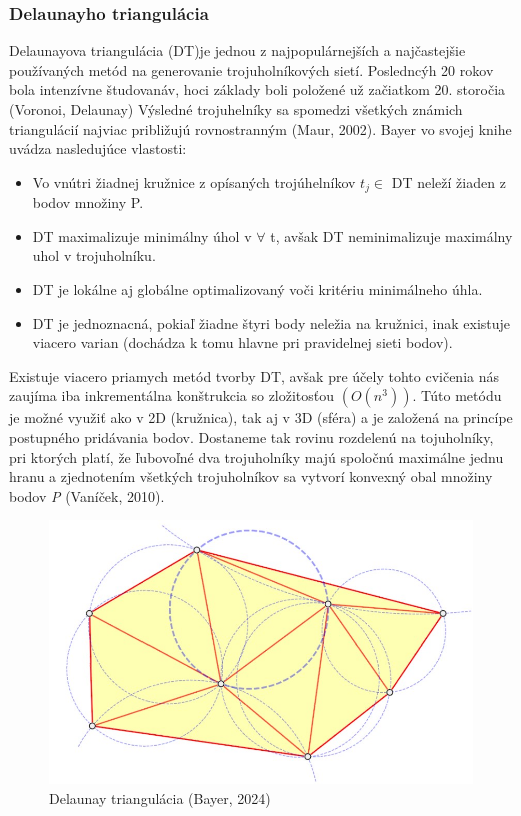 \documentclass[12pt]{article}
\begin{document}
\subsubsection*{Delaunayho triangulácia}
Delaunayova triangulácia (DT)je jednou z najpopulárnejších a najčastejšie používaných metód na generovanie trojuholníkových sietí. Posledncýh 20 rokov bola intenzívne študovanáv, hoci základy boli položené už začiatkom 20. storočia (Voronoi, Delaunay) Výsledné trojuhelníky sa spomedzi všetkých známich triangulácií najviac približujú rovnostranným (Maur, 2002). Bayer vo svojej knihe uvádza nasledujúce vlastosti: 
\begin{itemize}
    \item Vo vnútri žiadnej kružnice z opísaných trojúhelníkov  $t_j \in $  DT neleží žiaden z bodov množiny P.

    \item DT maximalizuje minimálny úhol v $\forall$ t, avšak DT neminimalizuje maximálny uhol v trojuholníku.
    \item DT je lokálne aj globálne optimalizovaný voči kritériu minimálneho úhla.
    \item DT je jednoznacná, pokiaľ žiadne štyri body neležia na kružnici, inak existuje viacero varian (dochádza k tomu hlavne pri pravidelnej sieti bodov).
\end{itemize}  \par
Existuje viacero priamych metód tvorby DT, avšak pre účely tohto cvičenia nás zaujíma iba inkrementálna konštrukcia so zložitosťou $(O(n^3))$. Túto metódu je možné využiť ako v 2D (kružnica), tak aj v 3D (sféra) a je založená na princípe postupného pridávania bodov. Dostaneme tak rovinu rozdelenú na tojuholníky, pri ktorých platí, že ľubovoľné dva trojuholníky majú spoločnú maximálne jednu hranu a zjednotením všetkých trojuholníkov sa vytvorí konvexný obal množiny bodov \textit{P} (Vaníček, 2010).\par
\begin{figure}[h]
    \centering
    \includegraphics[width=0.8\linewidth]{latex/images/dt.jpg}
    \caption{Delaunay triangulácia (Bayer, 2024)}
    \label{fig:enter-label}
\end{figure}
\end{document}
